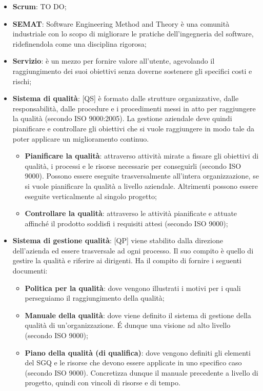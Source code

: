 \begin{itemize}
	\item \textbf{Scrum}: TO DO;
	\item \textbf{SEMAT}: Software Engineering Method and Theory è una comunità industriale con lo scopo di migliorare le pratiche dell'ingegneria del software, ridefinendola come una disciplina rigorosa;
	\item \textbf{Servizio}: è un mezzo per fornire valore all'utente, agevolando il raggiungimento dei suoi obiettivi senza doverne sostenere gli specifici costi e rischi;
	\item \textbf{Sistema di qualità}: [QS] è formato dalle strutture organizzative, dalle responsabilità, dalle procedure e i procedimenti messi in atto per raggiungere la qualità (secondo ISO 9000:2005). La gestione aziendale deve quindi pianificare e controllare gli obiettivi che si vuole raggiungere in modo tale da poter applicare un miglioramento continuo.
		\begin{itemize}
			\item \textbf{Pianificare la qualità}: attraverso attività mirate a fissare gli obiettivi di qualità, i processi e le risorse necessarie per conseguirli (secondo ISO 9000). Possono essere eseguite trasversalmente all'intera organizzazione, se si vuole pianificare la qualità a livello aziendale. Altrimenti possono essere eseguite verticalmente al singolo progetto;
			\item \textbf{Controllare la qualità}: attraverso le attività pianificate e attuate affinché il prodotto soddisfi i requisiti attesi (secondo ISO 9000);
		\end{itemize}

	\item \textbf{Sistema di gestione qualità}: [QP] viene stabilito dalla direzione dell'azienda ed essere trasversale ad ogni processo. Il suo compito è quello di gestire la qualità e riferire ai dirigenti. Ha il compito di fornire i seguenti documenti:
		\begin{itemize}
			\item \textbf{Politica per la qualità}: dove vengono illustrati i motivi per i quali perseguiamo il raggiungimento della qualità;
			\item \textbf{Manuale della qualità}: dove viene definito il sistema di gestione della qualità di un'organizzazione. \'E dunque una visione ad alto livello (secondo ISO 9000);
			\item \textbf{Piano della qualità (di qualifica)}: dove vengono definiti gli elementi del SGQ e le risorse che devono essere applicate in uno specifico caso (secondo ISO 9000). Concretizza dunque il manuale precedente a livello di progetto, quindi con vincoli di risorse e di tempo.
		\end{itemize}


\end{itemize}
